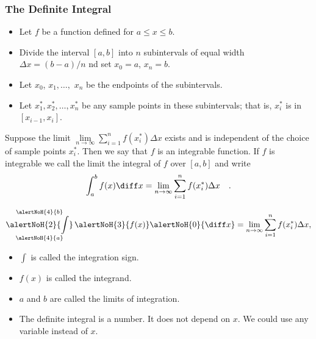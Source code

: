 \begin{frame}\frametitle{
The Definite Integral}
\begin{definition}
\begin{itemize}
\item  Let $f$ be a function defined for $a\leq x\leq b$.
\item  Divide the interval $[a,b]$ into $n$ subintervals of equal width $\Delta x = (b-a)/n$ nd set $x_0=a$, $x_n=b$.
\item  Let $x_0$, $x_1,\ldots ,$ $x_n $ be the endpoints of the subintervals.
\item  Let $x_1^*, x_2^*, \ldots , x_n^*$ be any sample points in these subintervals; that is, $x_i^*$ is in $[x_{i-1},x_i]$.
\end{itemize}
\abovedisplayskip=0pt
\belowdisplayskip=0pt
Suppose the limit $\lim\limits_{n\to \infty} \sum\limits_{i=1}^n f(x_i^*)\Delta x$ exists and is independent of the choice of sample points $x_i^*$. Then we say that $f$ is an integrable function. If $f$ is integrable we call the limit the integral of $f$ over $[a,b]$ and write
\[
\int_a^b f(x) \diff x = \lim_{n\to \infty} \sum_{i=1}^n f(x_i^*)\Delta x \quad .
\]
\end{definition}
\end{frame}

\begin{frame}
\[
\mathop{\alertNoH{ 2}{\int}}_{\alertNoH{ 4}{a}}^{\alertNoH{ 4}{b}} \alertNoH{ 3}{f(x)} \alertNoH{ 0}{\diff x} = \lim_{n\to \infty} \sum_{i=1}^n f(x_i^*)\Delta x,
\]
\begin{itemize}
\item<1-| alert@2>  $\int$ is called the integration sign.
\item<1-| alert@3>  $f(x)$ is called the integrand.
\item<1-| alert@4>  $a$ and $b$ are called the limits of integration.
\item<5->  The definite integral is a number.  It does not depend on $x$.  We could use any variable instead of $x$.
\end{itemize}
%
\end{frame}
